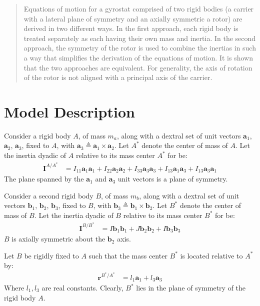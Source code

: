 \documentclass[letterpaper,11pt]{article}
\newcommand{\bs}[1]{ \boldsymbol{ #1 } }
\begin{document}
\begin{abstract}

  Equations of motion for a gyrostat comprised of two rigid bodies (a carrier
  with a lateral plane of symmetry and an axially symmetric a rotor) are
  derived in two different ways.  In the first approach, each rigid body is
  treated separately as each having their own mass and inertia.  In the second
  approach, the symmetry of the rotor is used to combine the inertias in such a
  way that simplifies the derivation of the equations of motion.  It is shown
  that the two approaches are equivalent.  For generality, the axis of rotation
  of the rotor is not aligned with a principal axis of the carrier.

\end{abstract}

\section*{Model Description}
Consider a rigid body $A$, of mass $m_a$, along with a dextral set of unit
vectors $\bs{a}_1$, $\bs{a}_2$, $\bs{a}_3$, fixed to $A$, with $\bs{a}_3
\triangleq \bs{a}_1 \times \bs{a}_2$.  Let $A^*$ denote the center of mass of
$A$.  Let the inertia dyadic of $A$ relative to its mass center $A^*$ for be:
\begin{align*}
  \bs{I}^{A/A^*} & = I_{11}\bs{a}_1\bs{a}_1 + I_{22}\bs{a}_2\bs{a}_2 +
  I_{33}\bs{a}_3\bs{a}_3 + I_{13}\bs{a}_1\bs{a}_3 + I_{13}\bs{a}_3\bs{a}_1
\end{align*}
The plane spanned by the $\bs{a}_1$ and $\bs{a}_3$ unit vectors is a plane of
symmetry.

Consider a second rigid body $B$, of mass $m_b$, along with a dextral set of unit
vectors $\bs{b}_1$, $\bs{b}_2$, $\bs{b}_3$, fixed to $B$, with $\bs{b}_3
\triangleq \bs{b}_1 \times \bs{b}_2$.  Let $B^*$ denote the center of mass of
$B$.  Let the inertia dyadic of $B$ relative to its mass center  $B^*$ for be:
\begin{align*}
  \bs{I}^{B/B^*} & = I\bs{b}_1\bs{b}_1 + J\bs{b}_2\bs{b}_2 + I\bs{b}_3\bs{b}_3
\end{align*}
$B$ is axially symmetric about the $\bs{b}_2$ axis.

Let $B$ be rigidly fixed to $A$ such that the mass center $B^*$ is located
relative to $A^*$ by:
\begin{align*}
  \bs{r}^{B^* / A^*} & = l_1 \bs{a}_1 + l_3 \bs{a}_3
\end{align*}
Where $l_1, l_3$ are real constants.  Clearly, $B^*$ lies in the plane of
symmetry of the rigid body $A$.
\end{document}
